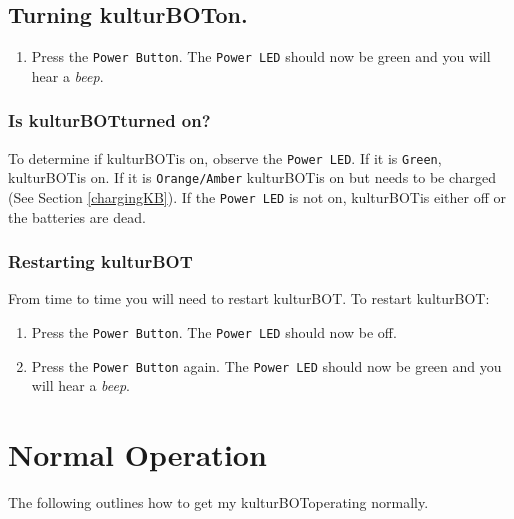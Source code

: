 \documentclass[]{article}
\newcommand{\kb}{kulturBOT}
\newcommand{\kbspace}{\kb \space}
\newcommand{\mykb}{my \kb}
\newcommand{\mykbspace}{\mykb \space}
\begin{document}
\subsection{Turning \kbspace on.}
\begin{enumerate}
\item Press the \texttt{Power Button}. The \texttt{Power LED} should now be green and you will hear a \textit{beep}.
\end{enumerate}

\subsubsection{Is \kbspace turned on?}
\label{isKbOn}
To determine if \kbspace is on, observe the \texttt{Power LED}. If it is \texttt{Green}, \kbspace is on. If it is \texttt{Orange/Amber} \kbspace is on but needs to be charged (See Section \ref{chargingKB}). If the \texttt{Power LED} is not on, \kbspace is either off or the batteries are dead.

\subsubsection{Restarting \kb}
\label{restartKb}
From time to time you will need to restart \kbspace. To restart \kb:

\begin{enumerate}
\item Press the \texttt{Power Button}. The \texttt{Power LED} should now be off.
\item Press the \texttt{Power Button} again. The \texttt{Power LED} should now be green and you will hear a \textit{beep}.
\end{enumerate}

\section{Normal Operation}
The following outlines how to get \mykbspace operating normally.
\end{document}
